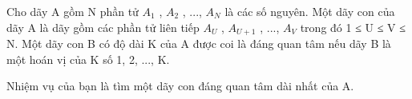 Cho dãy A gồm N phần tử $A_{1}$   , $A_{2}$   , ..., $A_{N}$   là các số nguyên. Một dãy con của dãy A là dãy gồm các phần tử liên tiếp $A_{U}$   , $A_{U+1}$   , ...,   $A_{V}$   trong đó 1 ≤ U ≤ V ≤ N. Một dãy con B có độ dài K của A được coi là đáng quan tâm nếu dãy B là một hoán vị của K số 1, 2, ..., K.  

   Nhiệm vụ của bạn là tìm một dãy con đáng quan tâm dài nhất của A.